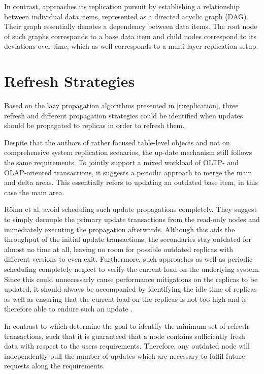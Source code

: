 In contrast, \cite{xiang:2008} approaches its replication pursuit by establishing a relationship between individual data items, represented as a directed acyclic graph (DAG).
Their graph essentially denotes a dependency between data items. The root node of such graphs corresponds to a base data item and child nodes correspond 
to its deviations over time, which as well corresponds to a multi-layer replication setup.





\section{Refresh Strategies}
\label{r:strategies}
Based on the lazy propagation algorithms presented in \ref{r:replication}, three refresh and different propagation strategies could be identified when updates should be propagated 
to replicas in order to refresh them.

Despite that the authors of \cite{psaroudakis:2015} rather focused table-level objects and not on comprehensive system replication scenarios, the up-date mechanism 
still follows the same requirements. To jointly support a mixed workload of OLTP- and OLAP-oriented transactions,
it suggests a periodic approach to merge the main and delta areas. This essentially refers to updating an outdated base item, in this case the main area.

Röhm et al. \cite{rohm:2002} avoid scheduling such update propagations completely. They suggest to simply decouple the primary update transactions from the read-only nodes
and immediately executing the propagation afterwards. Although this aids the throughput of the initial update transactions, the secondaries 
stay outdated for almost no time at all, leaving no room for possible outdated replicas with different versions to even exit. 
Furthermore, such approaches as well as periodic scheduling completely neglect to verify the current load on the underlying system.
Since this could unnecessarly cause performance mitigations on the replicas to be updated, it should always be accompanied by identifying the idle time of replicas as well 
as ensuring that the current load on the replicas is not too high and is therefore able to endure such an update \cite{voicu:2010}.

In contrast to \cite{peralta:2006} which determine the goal to identify the minimum set of refresh transactions, such that it is guaranteed that a node contains 
sufficiently fresh data with respect to the users requirements. Therefore, any outdated node will independently pull the number of updates which are necessary to 
fulfil future requests along the requirements.

